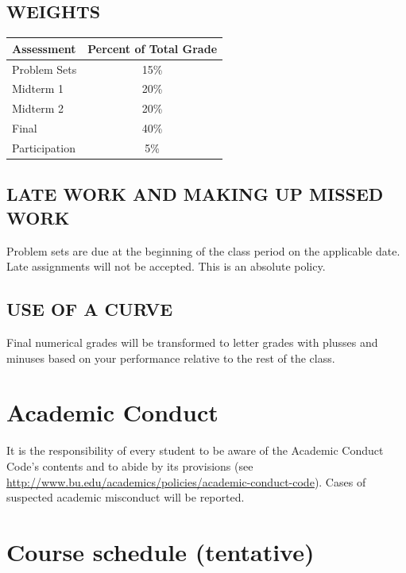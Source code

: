 \documentclass[12pt]{article}
\begin{document}
\subsection*{WEIGHTS}

\begin{center}
\begin{tabular}{l c}
Assessment & Percent of Total Grade \\
\hline
Problem Sets & 15\% \\
Midterm 1 & 20\% \\
Midterm 2 & 20\% \\
Final & 40\% \\
Participation & 5\%
\end{tabular}
\end{center}

\subsection*{LATE WORK AND MAKING UP MISSED WORK}

Problem sets are due at the beginning of the class period on the applicable date.
Late assignments will not be accepted.
This is an absolute policy.

\subsection*{USE OF A CURVE}

Final numerical grades will be transformed to letter grades with plusses and minuses
based on your performance relative to the rest of the class.



\section*{Academic Conduct}
It is the responsibility of every student to be aware of the Academic Conduct Code's contents
and to abide by its provisions
(see \url{http://www.bu.edu/academics/policies/academic-conduct-code}).
Cases of suspected academic misconduct will be reported.

\clearpage
\section*{Course schedule (tentative)}
\end{document}
